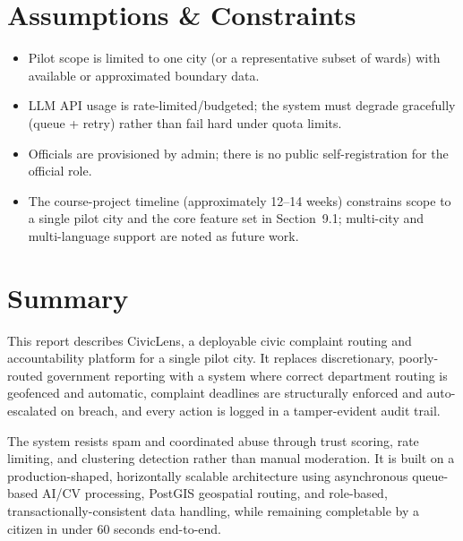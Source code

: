 \documentclass[12pt,a4paper]{article}
\begin{document}
\section{Assumptions \& Constraints}
\label{sec:assumptions}

\begin{itemize}
    \item Pilot scope is limited to one city (or a representative subset of wards) with available or approximated boundary data.
    \item LLM API usage is rate-limited/budgeted; the system must degrade gracefully (queue + retry) rather than fail hard under quota limits.
    \item Officials are provisioned by admin; there is no public self-registration for the official role.
    \item The course-project timeline (approximately 12--14 weeks) constrains scope to a single pilot city and the core feature set in Section~9.1; multi-city and multi-language support are noted as future work.
\end{itemize}

\section{Summary}

This report describes CivicLens, a deployable civic complaint routing and accountability platform for a single pilot city. It replaces discretionary, poorly-routed government reporting with a system where correct department routing is geofenced and automatic, complaint deadlines are structurally enforced and auto-escalated on breach, and every action is logged in a tamper-evident audit trail.

The system resists spam and coordinated abuse through trust scoring, rate limiting, and clustering detection rather than manual moderation. It is built on a production-shaped, horizontally scalable architecture using asynchronous queue-based AI/CV processing, PostGIS geospatial routing, and role-based, transactionally-consistent data handling, while remaining completable by a citizen in under 60 seconds end-to-end.
\end{document}

